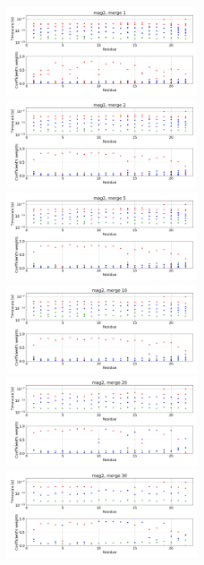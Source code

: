 \documentclass[12pt]{article}
\begin{document}
\begin{figure}
\centering
\includegraphics[width=0.5\textwidth]{mag2_1.png}
\includegraphics[width=0.5\textwidth]{mag2_2.png}
\includegraphics[width=0.5\textwidth]{mag2_5.png}
\includegraphics[width=0.5\textwidth]{mag2_10.png}
\includegraphics[width=0.5\textwidth]{mag2_20.png}
\includegraphics[width=0.5\textwidth]{mag2_30.png}
\end{figure}
\end{document}
